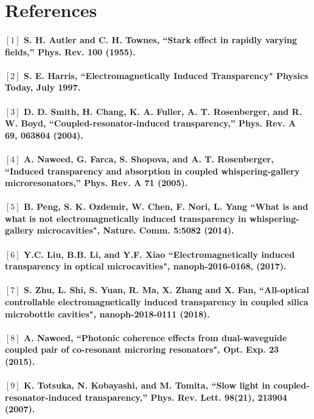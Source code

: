 \newpage
\section*{References}

\paragraph{\normalfont \large $[1]$ S. H. Autler and C. H. Townes, “Stark effect in rapidly varying fields,” Phys. Rev. \textbf{100} (1955). \\ 
\\$[2]$ S. E. Harris, “Electromagnetically Induced Transparency" Physics Today, July 1997. \\
\\$[3]$ D. D. Smith, H. Chang, K. A. Fuller, A. T. Rosenberger, and R. W. Boyd, “Coupled-resonator-induced transparency,” Phys. Rev. A \textbf{69}, 063804 (2004). \\
\\$[4]$  A. Naweed, G. Farca, S. Shopova, and A. T. Rosenberger, “Induced transparency and absorption in coupled
whispering-gallery microresonators,” Phys. Rev. A \textbf{71} (2005).\\
\\ $[5]$ B. Peng, S. K. Ozdemir, W. Chen, F. Nori, L. Yang “What is and what is not electromagnetically induced transparency in whispering-gallery microcavities", Nature. Comm. \textbf{5}:5082 (2014).\\
\\ $[6]$ Y.C. Liu, B.B. Li, and Y.F. Xiao “Electromagnetically induced transparency in optical microcavities", nanoph-2016-0168, (2017).\\
\\ $[7]$ S. Zhu, L. Shi, S. Yuan, R. Ma, X. Zhang and X. Fan, “All-optical controllable electromagnetically induced transparency in coupled silica microbottle cavities", nanoph-2018-0111 (2018).\\
\\ $[8]$ A. Naweed, “Photonic coherence effects from dual-waveguide coupled pair of co-resonant microring resonators", Opt. Exp. \textbf{23} (2015).\\
\\ $[9]$ K. Totsuka, N. Kobayashi, and M. Tomita, “Slow light in coupled-resonator-induced transparency,” Phys. Rev.
Lett. \textbf{98}(21), 213904 (2007).}